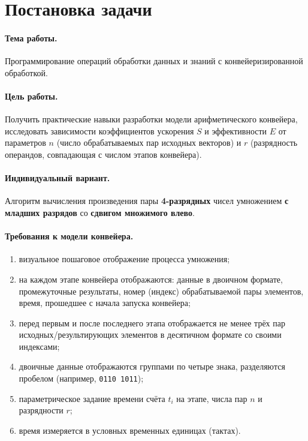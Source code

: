 \documentclass[12pt,a4paper]{article}
\begin{document}
\tableofcontents
\newpage

\section{Постановка задачи}

\paragraph{Тема работы.} Программирование операций обработки данных
и знаний с конвейеризированной обработкой.

\paragraph{Цель работы.} Получить практические навыки разработки
модели арифметического конвейера, исследовать зависимости
коэффициентов ускорения $S$ и эффективности $E$ от параметров
$n$ (число обрабатываемых пар исходных векторов) и $r$
(разрядность операндов, совпадающая с числом этапов конвейера).

\paragraph{Индивидуальный вариант.} Алгоритм вычисления произведения
пары \textbf{4-разрядных} чисел умножением \textbf{с младших
разрядов} со \textbf{сдвигом множимого влево}.

\paragraph{Требования к модели конвейера.}
\begin{enumerate}[leftmargin=*,itemsep=2pt]
  \item визуальное пошаговое отображение процесса умножения;
  \item на каждом этапе конвейера отображаются: данные в двоичном
        формате, промежуточные результаты, номер (индекс)
        обрабатываемой пары элементов, время, прошедшее
        с начала запуска конвейера;
  \item перед первым и после последнего этапа отображается не
        менее трёх пар исходных/результирующих элементов в
        десятичном формате со своими индексами;
  \item двоичные данные отображаются группами по четыре знака,
        разделяются пробелом (например, \texttt{0110 1011});
  \item параметрическое задание времени счёта $t_i$ на этапе,
        числа пар $n$ и разрядности $r$;
  \item время измеряется в условных временных единицах (тактах).
\end{enumerate}
\end{document}

